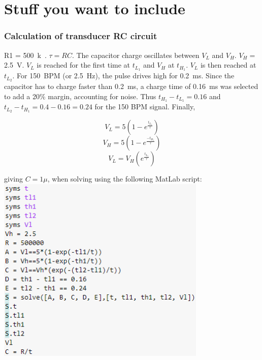      \chapter{Stuff you want to include}
     \label{app:C}
     
	\subsection{Calculation of transducer RC circuit}
	\label{app:matlab}
R1 = \SI{500}{k\Omega}. $\tau = RC$. The capacitor charge oscillates between $V_L$ and $V_H$. $V_H =$ \SI{2.5}{V}. $V_L$ is reached for the first time at $t_{L_1}$ and $V_H$ at $t_{H_1}$. $V_L$ is then reached at  $t_{L_2}$. For \SI{150}{BPM} (or \SI{2.5}{Hz}), the pulse drives high for \SI{0.2}{ms}. Since the capacitor has to charge faster than \SI{0.2}{ms}, a charge time of \SI{0.16}{ms} was selected to add a 20\% margin, accounting for noise. Thus $t_{H_1} - t_{L_1} = 0.16$ and $t_{L_2} - t_{H_1} = 0.4 - 0.16 = 0.24$ for the 150 BPM signal. Finally,

$$V_L = 5\left(1-e^{\frac{t_{L_1}}{\tau}}\right)$$
$$V_H = 5\left(1-e^{\frac{-t_{H_1}}{\tau}}\right)$$
$$V_L = V_H\left(e^{\frac{t_{L_1}}{\tau}}\right)$$

giving $C = 1\mu$, when solving using the following MatLab script:\\

\includegraphics[width = 0.75\textwidth]{./Figures/script}

